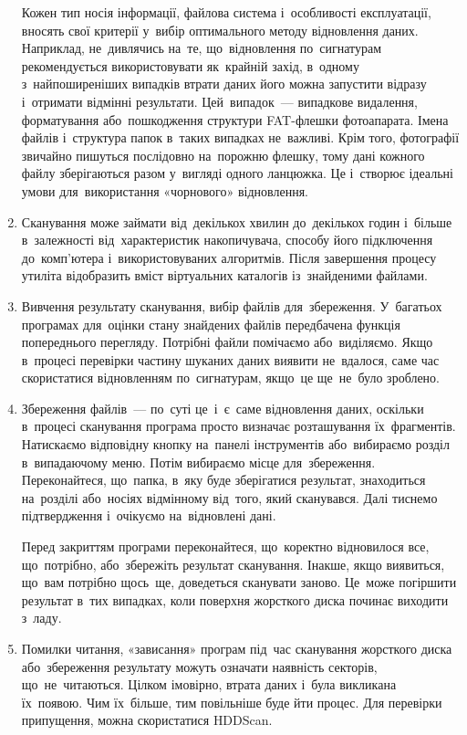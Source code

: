 \documentclass[
	a4paper,
	oneside,
	DIV = 12,
	fontsize = 13pt,
	headings = normal,
]{scrartcl}
\newcommand{\allcaps}[1]{{\addfontfeatures{LetterSpace = 5}#1}}
\begin{document}
\begin{enumerate}
				Кожен тип носія інформації, файлова система і~особливості експлуатації, вносять свої критерії у~вибір оптимального методу відновлення даних. Наприклад, не~дивлячись на~те, що~відновлення по~сигнатурам рекомендується використовувати як~крайній захід, в~одному з~найпоширеніших випадків втрати даних його можна запустити відразу і~отримати відмінні результати. Цей~випадок~— випадкове видалення, форматування або~пошкодження структури \textenglish{\allcaps{FAT}}-флешки фотоапарата. Імена файлів і~структура папок в~таких випадках не~важливі. Крім того, фотографії звичайно пишуться послідовно на~порожню флешку, тому дані кожного файлу зберігаються разом у~вигляді одного ланцюжка. Це і~створює ідеальні умови для~використання «чорнового» відновлення. 

			\item Сканування може займати від~декількох хвилин до~декількох годин і~більше в~залежності від~характеристик накопичувача, способу його підключення до~комп'ютера і~використовуваних алгоритмів. Після завершення процесу утиліта відобразить вміст віртуальних каталогів із~знайденими файлами. 

			\item Вивчення результату сканування, вибір файлів для~збереження. У~багатьох програмах для~оцінки стану знайдених файлів передбачена функція попереднього перегляду. Потрібні файли помічаємо або~виділяємо. Якщо в~процесі перевірки частину шуканих даних виявити не~вдалося, саме час скористатися відновленням по~сигнатурам, якщо~це ще~не~було зроблено. 

			\item Збереження файлів~— по~суті це~і~є~саме відновлення даних, оскільки в~процесі сканування програма просто визначає розташування їх~фрагментів. Натискаємо відповідну кнопку на~панелі інструментів або~вибираємо розділ в~випадаючому меню. Потім вибираємо місце для~збереження. Переконайтеся, що~папка, в~яку буде зберігатися результат, знаходиться на~розділі або~носіях відмінному від~того, який сканувався. Далі тиснемо підтвердження і~очікуємо на~відновлені дані. 

		Перед закриттям програми переконайтеся, що~коректно відновилося все, що~потрібно, або~збережіть результат сканування. Інакше, якщо виявиться, що~вам потрібно щось~ще, доведеться сканувати заново. Це~може погіршити результат в~тих випадках, коли поверхня жорсткого диска починає виходити з~ладу. 

	\item Помилки читання, «зависання» програм під~час сканування жорсткого диска або~збереження результату можуть означати наявність секторів, що~не~читаються. Цілком імовірно, втрата даних і~була викликана їх~появою. Чим їх~більше, тим повільніше буде йти процес. Для перевірки припущення, можна скористатися \textenglish{HDDScan}. 
		\end{enumerate}
\end{document}
